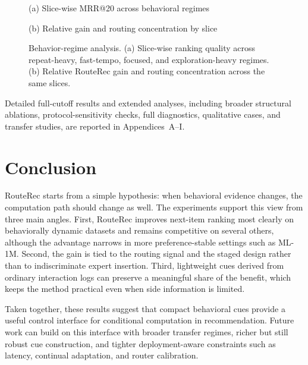 \documentclass[sigconf,review,anonymous]{acmart}
\newcommand{\placeholderpanel}[1]{\fbox{\rule{0pt}{#1}\rule{0.92\linewidth}{0pt}}}
\begin{document}
\begin{figure}[!t]
  \centering
  \begin{minipage}[t]{0.48\columnwidth}
    \centering
    \placeholderpanel{1.25in}

    \vspace{0.35em}
    {\footnotesize (a) Slice-wise MRR@20 across behavioral regimes}
  \end{minipage}\hfill
  \begin{minipage}[t]{0.48\columnwidth}
    \centering
    \placeholderpanel{1.25in}

    \vspace{0.35em}
    {\footnotesize (b) Relative gain and routing concentration by slice}
  \end{minipage}
  \caption{Behavior-regime analysis. (a) Slice-wise ranking quality across repeat-heavy, fast-tempo, focused, and exploration-heavy regimes. (b) Relative RouteRec gain and routing concentration across the same slices.}
  \label{fig:behavior-regime-panels}
\end{figure}

Detailed full-cutoff results and extended analyses, including broader structural ablations, protocol-sensitivity checks, full diagnostics, qualitative cases, and transfer studies, are reported in Appendices~A--I.

\section{Conclusion}
\label{sec:conclusion}
RouteRec starts from a simple hypothesis: when behavioral evidence changes, the computation path should change as well. The experiments support this view from three main angles. First, RouteRec improves next-item ranking most clearly on behaviorally dynamic datasets and remains competitive on several others, although the advantage narrows in more preference-stable settings such as ML-1M. Second, the gain is tied to the routing signal and the staged design rather than to indiscriminate expert insertion. Third, lightweight cues derived from ordinary interaction logs can preserve a meaningful share of the benefit, which keeps the method practical even when side information is limited.

Taken together, these results suggest that compact behavioral cues provide a useful control interface for conditional computation in recommendation. Future work can build on this interface with broader transfer regimes, richer but still robust cue construction, and tighter deployment-aware constraints such as latency, continual adaptation, and router calibration.
\end{document}
